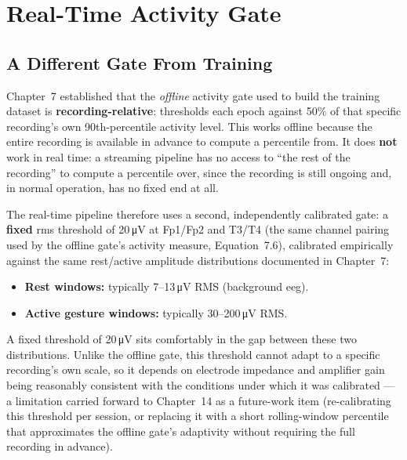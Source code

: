 \section{Real-Time Activity Gate}
\label{sec:inf_gate}

\subsection{A Different Gate From Training}

Chapter~7 established that the \emph{offline} activity gate used to
build the training dataset is \textbf{recording-relative}:
 thresholds each epoch against 50\% of
that specific recording's own 90th-percentile activity level. This
works offline because the entire recording is available in advance
to compute a percentile from. It does \textbf{not} work in real
time: a streaming pipeline has no access to ``the rest of the
recording'' to compute a percentile over, since the recording is
still ongoing and, in normal operation, has no fixed end at all.

The real-time pipeline therefore uses a second, independently
calibrated gate: a \textbf{fixed} \acrshort{rms} threshold of
20\,\si{\micro\volt} at Fp1/Fp2 and T3/T4 (the same channel pairing
used by the offline gate's activity measure, Equation~7.6),
calibrated empirically against the same rest/active amplitude
distributions documented in Chapter~7:

\begin{itemize}[leftmargin=*]
    \item \textbf{Rest windows:} typically
    7--13\,\si{\micro\volt} RMS (background \acrshort{eeg}).
    \item \textbf{Active gesture windows:} typically
    30--200\,\si{\micro\volt} RMS.
\end{itemize}

A fixed threshold of 20\,\si{\micro\volt} sits comfortably in the
gap between these two distributions. Unlike the offline gate, this
threshold cannot adapt to a specific recording's own scale, so it
depends on electrode impedance and amplifier gain being
reasonably consistent with the conditions under which it was
calibrated --- a limitation carried forward to Chapter~14 as a
future-work item (re-calibrating this threshold per session, or
replacing it with a short rolling-window percentile that
approximates the offline gate's adaptivity without requiring the
full recording in advance).

